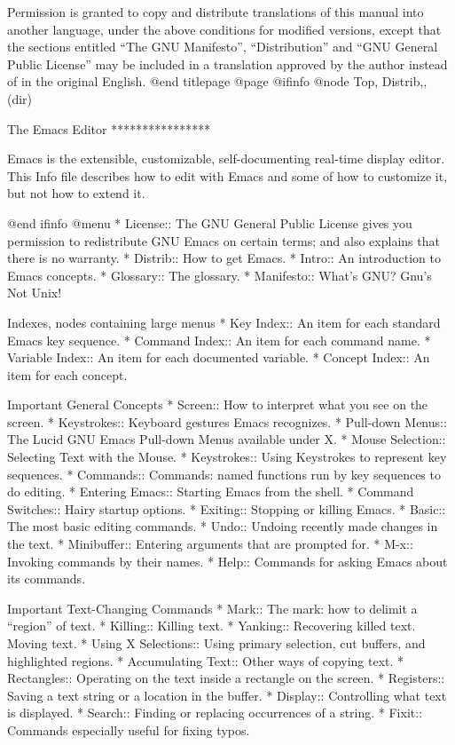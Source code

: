 Permission is granted to copy and distribute translations of this manual
into another language, under the above conditions for modified versions,
except that the sections entitled ``The GNU Manifesto'',
``Distribution'' and ``GNU General Public License'' may be included in a
translation approved by the author instead of in the original English.
@end titlepage
@page
@ifinfo
@node Top, Distrib,, (dir)

The Emacs Editor
****************

Emacs is the extensible, customizable, self-documenting real-time
display editor.  This Info file describes how to edit with Emacs
and some of how to customize it, but not how to extend it.

@end ifinfo
@menu
* License::     The GNU General Public License gives you permission
		to redistribute GNU Emacs on certain terms; and also
		explains that there is no warranty.
* Distrib::     How to get Emacs.
* Intro::       An introduction to Emacs concepts.
* Glossary::    The glossary.
* Manifesto::   What's GNU?  Gnu's Not Unix!

Indexes, nodes containing large menus
* Key Index::      An item for each standard Emacs key sequence.
* Command Index::  An item for each command name.
* Variable Index:: An item for each documented variable.
* Concept Index::  An item for each concept.

Important General Concepts
* Screen::      How to interpret what you see on the screen.
* Keystrokes::  Keyboard gestures Emacs recognizes.
* Pull-down Menus:: 
                The Lucid GNU Emacs Pull-down Menus available under X.
* Mouse Selection:: 
                Selecting Text with the Mouse.
* Keystrokes:: 
                Using Keystrokes to represent key sequences.
* Commands::    Commands: named functions run by key sequences to do editing.
* Entering Emacs::    
                Starting Emacs from the shell.
* Command Switches::  
                Hairy startup options.
* Exiting::     Stopping or killing Emacs.
* Basic::       The most basic editing commands.
* Undo::        Undoing recently made changes in the text.
* Minibuffer::  Entering arguments that are prompted for.
* M-x::         Invoking commands by their names.
* Help::        Commands for asking Emacs about its commands.

Important Text-Changing Commands
* Mark::        The mark: how to delimit a ``region'' of text.
* Killing::     Killing text.
* Yanking::     Recovering killed text.  Moving text.
* Using X Selections::
                Using primary selection, cut buffers, and highlighted regions.
* Accumulating Text::
                Other ways of copying text.
* Rectangles::  Operating on the text inside a rectangle on the screen.
* Registers::   Saving a text string or a location in the buffer.
* Display::     Controlling what text is displayed.
* Search::      Finding or replacing occurrences of a string.
* Fixit::       Commands especially useful for fixing typos.

